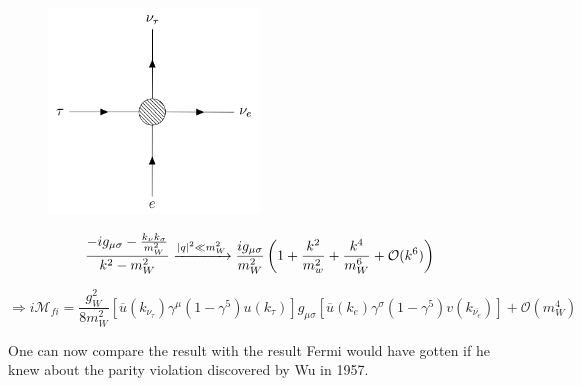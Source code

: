 \documentclass[../Bachelorarbeit.tex]{subfiles}
\begin{document}
\begin{figure}[h]
    \centering
    \includegraphics[width=0.5\textwidth]{images/propagator_collaps.PNG}
\end{figure}
\begin{equation}
    \frac{-ig_{\mu\sigma}-\frac{k_{\nu}k_{\sigma}}{m_{W}^{2}}}{k^{2}-m_{W}^{2}} \xrightarrow{\abs{q}^{2} \ll m_{W}^{2}} \frac{ig_{\mu\sigma}}{m_{W}^{2}} \left( 1 + \frac{k^{2}}{m_{w}^{2}}+\frac{k^{4}}{m_{W}^{6}}+\mathcal{O}(k^6) \right)
    \label{eq:Fermi_propergator}
\end{equation}

\begin{equation}
    \Rightarrow i\mathcal{M}_{fi}=\frac{g_{W}^{2}}{8 m_{W}^{2}} \left[ \overline{u}(k_{\nu_{\tau}})\gamma^{\mu}(1-\gamma^{5})u(k_{\tau}) \right] g_{\mu\sigma} \left[ \overline{u}(k_{e})\gamma^{\sigma}(1-\gamma^{5})v(k_{\overline{\nu_{e}}}) \right] + \mathcal{O}(m_{W}^{4})
    \label{eq:Fermi_colapse}
\end{equation}

One can now compare the result with the result Fermi would have gotten if he knew about the parity violation discovered by Wu in 1957.
\end{document}
